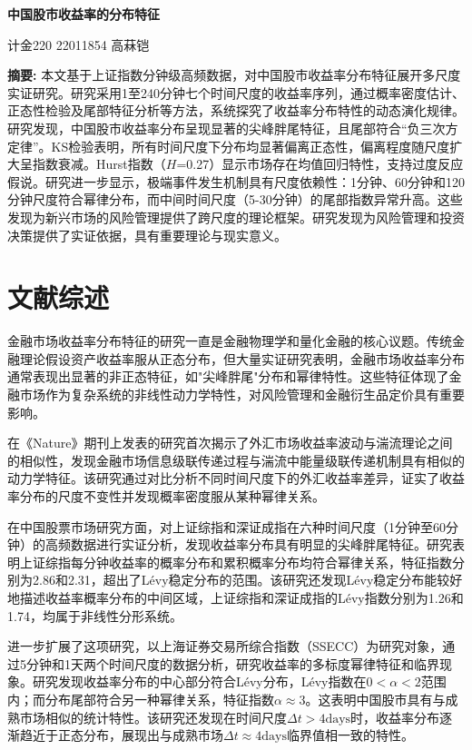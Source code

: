 \documentclass[12pt, a4paper]{article}
\begin{document}
\begin{center}
\LARGE\textbf{中国股市收益率的分布特征}

\vspace{1cm}
\large 计金220 22011854 高菻铠
\end{center}

\noindent \textbf{摘要:} 本文基于上证指数分钟级高频数据，对中国股市收益率分布特征展开多尺度实证研究。研究采用1至240分钟七个时间尺度的收益率序列，通过概率密度估计、正态性检验及尾部特征分析等方法，系统探究了收益率分布特性的动态演化规律。研究发现，中国股市收益率分布呈现显著的尖峰胖尾特征，且尾部符合“负三次方定律”。KS检验表明，所有时间尺度下分布均显著偏离正态性，偏离程度随尺度扩大呈指数衰减。Hurst指数（$H$=0.27）显示市场存在均值回归特性，支持过度反应假说。研究进一步显示，极端事件发生机制具有尺度依赖性：1分钟、60分钟和120分钟尺度符合幂律分布，而中间时间尺度（5-30分钟）的尾部指数异常升高。这些发现为新兴市场的风险管理提供了跨尺度的理论框架。研究发现为风险管理和投资决策提供了实证依据，具有重要理论与现实意义。

\section{文献综述}

金融市场收益率分布特征的研究一直是金融物理学和量化金融的核心议题。传统金融理论假设资产收益率服从正态分布，但大量实证研究表明，金融市场收益率分布通常表现出显著的非正态特征，如"尖峰胖尾"分布和幂律特性\cite{du2007}。这些特征体现了金融市场作为复杂系统的非线性动力学特性，对风险管理和金融衍生品定价具有重要影响。

\citet{ghashghaie1996}在《Nature》期刊上发表的研究首次揭示了外汇市场收益率波动与湍流理论之间的相似性，发现金融市场信息级联传递过程与湍流中能量级联传递机制具有相似的动力学特征。该研究通过对比分析不同时间尺度下的外汇收益率差异，证实了收益率分布的尺度不变性并发现概率密度服从某种幂律关系。

在中国股票市场研究方面，\citet{du2007}对上证综指和深证成指在六种时间尺度（1分钟至60分钟）的高频数据进行实证分析，发现收益率分布具有明显的尖峰胖尾特征。研究表明上证综指每分钟收益率的概率分布和累积概率分布均符合幂律关系，特征指数分别为2.86和2.31，超出了Lévy稳定分布的范围。该研究还发现Lévy稳定分布能较好地描述收益率概率分布的中间区域，上证综指和深证成指的Lévy指数分别为1.26和1.74，均属于非线性分形系统。

\citet{chen2008}进一步扩展了这项研究，以上海证券交易所综合指数（SSECC）为研究对象，通过5分钟和1天两个时间尺度的数据分析，研究收益率的多标度幂律特征和临界现象。研究发现收益率分布的中心部分符合Lévy分布，Lévy指数在$0<\alpha<2$范围内；而分布尾部符合另一种幂律关系，特征指数$\alpha\approx3$。这表明中国股市具有与成熟市场相似的统计特性。该研究还发现在时间尺度$\Delta t>4\text{days}$时，收益率分布逐渐趋近于正态分布，展现出与成熟市场$\Delta t\approx4\text{days}$临界值相一致的特性。
\end{document}
